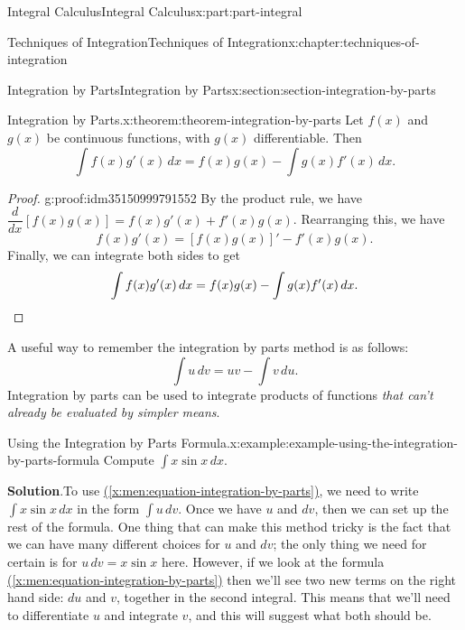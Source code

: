 \documentclass[twoside,10pt,]{book}
\newcommand{\blocktitlefont}{\relax}
\newcommand{\xreffont}{\relax}
\numberwithin{equation}{part}
\newcommand{\qedhere}{\relax}
\newcommand{\dv}[3][]{\dfrac{d^{#1} #2}{d #3^{#1}}}
\begin{document}
\begin{partptx}{Integral Calculus}{}{Integral Calculus}{}{}{x:part:part-integral}
\begin{chapterptx}{Techniques of Integration}{}{Techniques of Integration}{}{}{x:chapter:techniques-of-integration}
\begin{sectionptx}{Integration by Parts}{}{Integration by Parts}{}{}{x:section:section-integration-by-parts}
\begin{theorem}{Integration by Parts.}{}{x:theorem:theorem-integration-by-parts}%
%
Let \(f(x)\) and \(g(x)\) be continuous functions, with \(g(x)\) differentiable. Then%
%
\begin{equation*}
\int f(x)g'(x)\,dx = f(x)g(x) - \int g(x)f'(x)\,dx.
\end{equation*}
\end{theorem}
\begin{proof}{}{g:proof:idm35150999791552}
By the product rule, we have \(\dv{}{x}[f(x)g(x)] = f(x)g'(x) + f'(x)g(x)\). Rearranging this, we have%
\begin{equation*}
f(x)g'(x) = [f(x)g(x)]' - f'(x)g(x).
\end{equation*}
Finally, we can integrate both sides to get%
\begin{equation*}
\int f(x)g'(x)\,dx = f(x)g(x) - \int g(x)f'(x)\,dx.\qedhere
\end{equation*}
%
\end{proof}
A useful way to remember the integration by parts method is as follows:%
\begin{equation}
\int u\,dv = uv - \int v\,du.\label{x:men:equation-integration-by-parts}
\end{equation}
Integration by parts can be used to integrate products of functions \emph{that can't already be evaluated by simpler means}.%
\begin{example}{Using the Integration by Parts Formula.}{x:example:example-using-the-integration-by-parts-formula}%
Compute \(\int x\sin x\,dx\).%
\par\smallskip%
\noindent\textbf{\blocktitlefont Solution}.\hypertarget{g:solution:idm35150999787328}{}\quad{}To use \hyperref[x:men:equation-integration-by-parts]{({\xreffont\ref{x:men:equation-integration-by-parts}})}, we need to write \(\int x\sin x\,dx\) in the form \(\int u\,dv\). Once we have \(u\) and \(dv\), then we can set up the rest of the formula. One thing that can make this method tricky is the fact that we can have many different choices for \(u\) and \(dv\); the only thing we need for certain is for \(u\,dv = x\sin x\) here. However, if we look at the formula \hyperref[x:men:equation-integration-by-parts]{({\xreffont\ref{x:men:equation-integration-by-parts}})} then we'll see two new terms on the right hand side: \(du\) and \(v\), together in the second integral. This means that we'll need to differentiate \(u\) and integrate \(v\), and this will suggest what both should be.%

\end{example}
\end{sectionptx}
\end{chapterptx}
\end{partptx}
\end{document}
